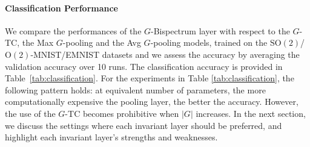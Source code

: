 \documentclass{article}
\theoremstyle{plain}
\theoremstyle{definition}
\theoremstyle{remark}
\begin{document}
\paragraph{Classification Performance} We compare the performances of the $G$-Bispectrum layer with respect to the $G$-TC, the Max $G$-pooling and the Avg $G$-pooling models, trained on the $\mathrm{SO}(2)$/$\mathrm{O}(2)$-MNIST/EMNIST datasets and we assess the accuracy by averaging the validation accuracy over 10 runs. The classification accuracy is provided in Table~\ref{tab:classification}. For the experiments in Table \ref{tab:classification}, the following pattern holds: at equivalent number of parameters, the more computationally expensive the pooling layer, the better the accuracy. However, the use of the $G$-TC becomes prohibitive when $|G|$ increases. In the next section, we discuss the settings where each invariant layer should be preferred, and highlight each invariant layer's strengths and weaknesses.
\end{document}
